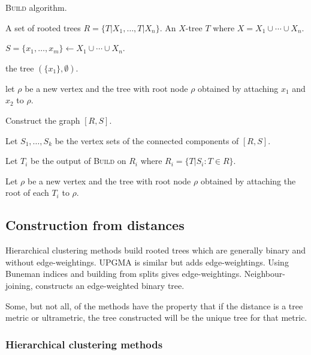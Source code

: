 \begin{algorithm}[h]
  \caption{\textsc{Build} algorithm.}
  \label{alg:build}

  \begin{algorithmic}
    \Require A set of rooted trees $R = \{T|X_1,\dotsc,T|X_n\}$.
    \Ensure  An $X$-tree $T$ where $X = X_1 \cup \dotsb \cup X_n$.

    \State $S = \{x_1,\dotsc,x_m\} \gets X_1 \cup \dotsb \cup X_n$.

     \Return the tree $(\{x_1\},\emptyset)$. \EndIf

     let $\rho$ be a new vertex and \Return the tree with root
    node $\rho$ obtained by attaching $x_1$ and $x_2$ to $\rho$. \EndIf

    \State Construct the graph $[R,S]$.

    \State Let $S_1,\dotsc,S_k$ be the vertex sets of the connected components
    of $[R,S]$.

    \State Let $T_i$ be the output of \textsc{Build} on $R_i$ where $R_i =
    \{T|S_i \colon T \in R\}$.
    \EndFor

    \State Let $\rho$ be a new vertex and \Return the tree with root node
    $\rho$ obtained by attaching the root of each $T_i$ to $\rho$.
    
  \end{algorithmic}
\end{algorithm}


\subsection{Construction from distances}
\label{sec:constr-from-dist}

Hierarchical clustering methods build rooted trees which are generally binary
and without edge-weightings.  UPGMA is similar but adds edge-weightings.
Using Buneman indices and building from splits gives edge-weightings.
Neighbour-joining, constructs an edge-weighted binary tree.

Some, but not all, of the methods have the property that if the distance is a
tree metric or ultrametric, the tree constructed will be the unique tree for
that metric.

\subsubsection{Hierarchical clustering methods}
\label{sec:hier-clust-meth}

